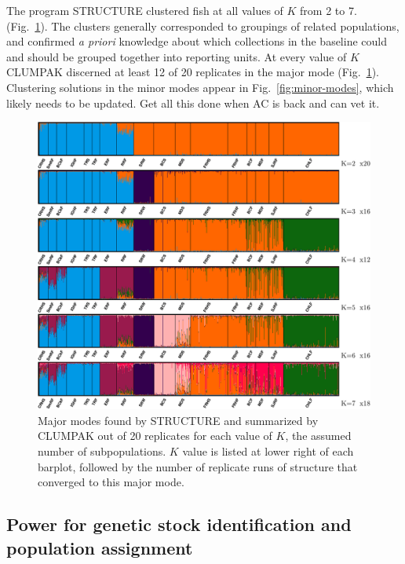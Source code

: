 The program STRUCTURE clustered fish at all values of $K$ from 2 to 7.
(Fig.~\ref{fig:struct}).  The clusters generally corresponded to groupings of related populations, and confirmed
{\em a priori} knowledge about which collections in the baseline could and should be
grouped together into reporting units.  At every value of $K$ CLUMPAK discerned at least
12 of 20 replicates in the major mode (Fig.~\ref{fig:struct}).   
Clustering solutions in the minor
modes appear in Fig.~\ref{fig:minor-modes}, which likely needs to be updated.  Get all this done
when AC is back and can vet it.
\begin{figure}
\newcommand{\structcap}{\footnotesize Major modes found by STRUCTURE and summarized
by CLUMPAK out of 20 replicates for each value of $K$, the assumed number of
subpopulations. $K$ value is listed at lower right of each barplot, followed by the number
of replicate runs of structure that converged to this major mode.}
\begin{center}
\includegraphics[width=\columnwidth]{images/clumpak-crop.pdf}
\end{center}
\caption[\structcap]{\structcap}
\label{fig:struct}
\end{figure}


\subsection*{Power for genetic stock identification and population assignment}

